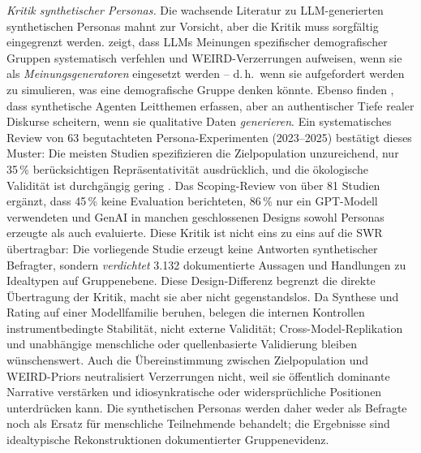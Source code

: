 \documentclass[12pt,a4paper]{article}
\begin{document}
\emph{Kritik synthetischer Personas.} Die wachsende Literatur zu LLM-generierten synthetischen Personas mahnt zur Vorsicht, aber die Kritik muss sorgfältig eingegrenzt werden. \citet{Santurkar2023} zeigt, dass LLMs Meinungen spezifischer demografischer Gruppen systematisch verfehlen und \glqq WEIRD\grqq-Verzerrungen aufweisen, wenn sie als \emph{Meinungsgeneratoren} eingesetzt werden -- d.\,h.\ wenn sie aufgefordert werden zu simulieren, was eine demografische Gruppe denken könnte. Ebenso finden \citet{Argyle2023}, dass synthetische Agenten Leitthemen erfassen, aber an authentischer Tiefe realer Diskurse scheitern, wenn sie qualitative Daten \emph{generieren}. Ein systematisches Review von 63 begutachteten Persona-Experimenten (2023--2025) bestätigt dieses Muster: Die meisten Studien spezifizieren die Zielpopulation unzureichend, nur 35\,\% berücksichtigen Repräsentativität ausdrücklich, und die ökologische Validität ist durchgängig gering \citep{Batzner2025WhosePersonae}. Das Scoping-Review von \citet{AminEtAl2026GenAIPersonas} über 81 Studien ergänzt, dass 45\,\% keine Evaluation berichteten, 86\,\% nur ein GPT-Modell verwendeten und GenAI in manchen geschlossenen Designs sowohl Personas erzeugte als auch evaluierte. Diese Kritik ist nicht eins zu eins auf die SWR übertragbar: Die vorliegende Studie erzeugt keine Antworten synthetischer Befragter, sondern \emph{verdichtet} 3.132 dokumentierte Aussagen und Handlungen zu Idealtypen auf Gruppenebene. Diese Design-Differenz begrenzt die direkte Übertragung der Kritik, macht sie aber nicht gegenstandslos. Da Synthese und Rating auf einer Modellfamilie beruhen, belegen die internen Kontrollen instrumentbedingte Stabilität, nicht externe Validität; Cross-Model-Replikation und unabhängige menschliche oder quellenbasierte Validierung bleiben wünschenswert. Auch die Übereinstimmung zwischen Zielpopulation und WEIRD-Priors neutralisiert Verzerrungen nicht, weil sie öffentlich dominante Narrative verstärken und idiosynkratische oder widersprüchliche Positionen unterdrücken kann. Die synthetischen Personas werden daher weder als Befragte noch als Ersatz für menschliche Teilnehmende behandelt; die Ergebnisse sind idealtypische Rekonstruktionen dokumentierter Gruppenevidenz.
\end{document}
